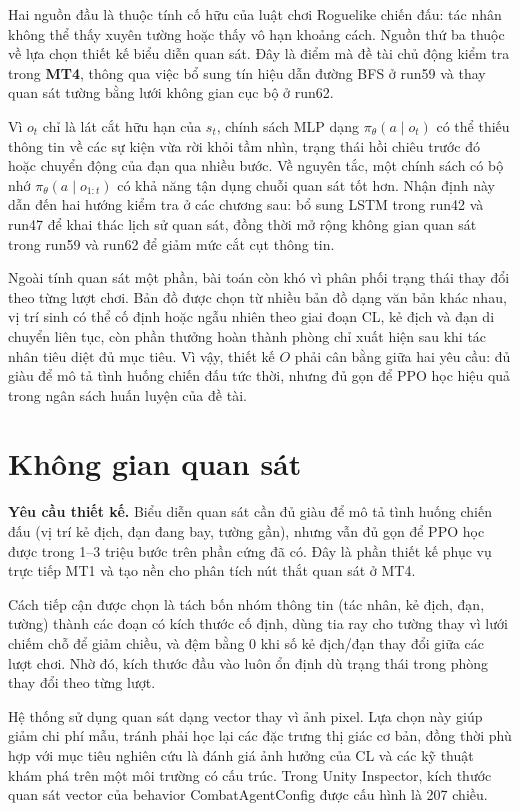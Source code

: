 Hai nguồn đầu là thuộc tính cố hữu của luật chơi Roguelike chiến đấu: tác nhân không thể thấy xuyên tường hoặc thấy vô hạn khoảng cách. Nguồn thứ ba thuộc về lựa chọn thiết kế biểu diễn quan sát. Đây là điểm mà đề tài chủ động kiểm tra trong \textbf{MT4}, thông qua việc bổ sung tín hiệu dẫn đường BFS ở run59 và thay quan sát tường bằng lưới không gian cục bộ ở run62.

Vì $o_t$ chỉ là lát cắt hữu hạn của $s_t$, chính sách MLP dạng $\pi_\theta(a \mid o_t)$ có thể thiếu thông tin về các sự kiện vừa rời khỏi tầm nhìn, trạng thái hồi chiêu trước đó hoặc chuyển động của đạn qua nhiều bước. Về nguyên tắc, một chính sách có bộ nhớ $\pi_\theta(a \mid o_{1:t})$ có khả năng tận dụng chuỗi quan sát tốt hơn. Nhận định này dẫn đến hai hướng kiểm tra ở các chương sau: bổ sung LSTM trong run42 và run47 để khai thác lịch sử quan sát, đồng thời mở rộng không gian quan sát trong run59 và run62 để giảm mức cắt cụt thông tin.

Ngoài tính quan sát một phần, bài toán còn khó vì phân phối trạng thái thay đổi theo từng lượt chơi. Bản đồ được chọn từ nhiều bản đồ dạng văn bản khác nhau, vị trí sinh có thể cố định hoặc ngẫu nhiên theo giai đoạn CL, kẻ địch và đạn di chuyển liên tục, còn phần thưởng hoàn thành phòng chỉ xuất hiện sau khi tác nhân tiêu diệt đủ mục tiêu. Vì vậy, thiết kế $O$ phải cân bằng giữa hai yêu cầu: đủ giàu để mô tả tình huống chiến đấu tức thời, nhưng đủ gọn để PPO học hiệu quả trong ngân sách huấn luyện của đề tài.

\section{Không gian quan sát}

\textbf{Yêu cầu thiết kế.} Biểu diễn quan sát cần đủ giàu để mô tả tình huống chiến đấu (vị trí kẻ địch, đạn đang bay, tường gần), nhưng vẫn đủ gọn để PPO học được trong 1--3 triệu bước trên phần cứng đã có. Đây là phần thiết kế phục vụ trực tiếp MT1 và tạo nền cho phân tích nút thắt quan sát ở MT4.

Cách tiếp cận được chọn là tách bốn nhóm thông tin (tác nhân, kẻ địch, đạn, tường) thành các đoạn có kích thước cố định, dùng tia ray cho tường thay vì lưới chiếm chỗ để giảm chiều, và đệm bằng 0 khi số kẻ địch/đạn thay đổi giữa các lượt chơi. Nhờ đó, kích thước đầu vào luôn ổn định dù trạng thái trong phòng thay đổi theo từng lượt.

Hệ thống sử dụng quan sát dạng vector thay vì ảnh pixel. Lựa chọn này giúp giảm chi phí mẫu, tránh phải học lại các đặc trưng thị giác cơ bản, đồng thời phù hợp với mục tiêu nghiên cứu là đánh giá ảnh hưởng của CL và các kỹ thuật khám phá trên một môi trường có cấu trúc. Trong Unity Inspector, kích thước quan sát vector của behavior CombatAgentConfig được cấu hình là 207 chiều.

